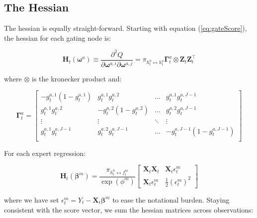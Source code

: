\documentclass[12pt]{article}
\newcommand{\bw}[1]{\boldsymbol{\omega}^{#1}}
\newcommand{\Ht}[1]{\mathbf{H}_{t}(#1)}
\newcommand{\gateprod}[2]{\pi_{#1 \longleftrightarrow #2}}
\begin{document}
\bigskip



\subsection{The Hessian}

The hessian is equally straight-forward. Starting with equation
(\ref{eq:gateScore}), the hessian for each gating node is:


\begin{equation} \label{eq:nodehessian}
  \Ht{\bw{a}} \equiv \frac{\partial^{2} Q}{\partial \boldsymbol{\omega}^{a,i} \partial \boldsymbol{\omega}^{a,j}} = \gateprod{h^{0}_{t}}{h^{a}_{t}} \boldsymbol{\Gamma}^{a}_{t} \otimes  \boldsymbol{Z}_{t} \boldsymbol{Z}_{t}^\top
\end{equation}

where $\otimes$ is the kronecker product and:

\begin{equation}
  \boldsymbol{\Gamma}^{a}_{t} = \begin{bmatrix}
  -g_{t}^{a,1}(1-g_{t}^{a,1}) & g_{t}^{a,1}g_{t}^{a,2}    & \dots  & g_{t}^{a,1}g_{t}^{a,J-1}       \\
  g_{t}^{a,1}g_{t}^{a,2}    & -g_{t}^{a,2}(1-g_{t}^{a,2}) & \dots  & g_{t}^{a,2}g_{t}^{a,J-1}       \\
  \vdots                     &  \vdots                    & \ddots & \vdots                 \\
  g_{t}^{a,1}g_{t}^{a,J-1}  & g_{t}^{a,2}g_{t}^{a,J-1}  & \dots  & -g_{t}^{a,J-1}(1-g_{t}^{a,J-1}) \\
    \end{bmatrix}
\end{equation}

For each expert regression:


\begin{equation}
  \Ht{\boldsymbol{\beta}^{m}} = \frac{\gateprod{h^{0}_{t}}{f^{m}_{t}}}{\exp{(\phi^{m})}} \begin{bmatrix}
  \boldsymbol{X}_{t} \boldsymbol{X}_{t}     &  \boldsymbol{X}_{t} \epsilon^{m}_{t}     \\
  \boldsymbol{X}_{t} \epsilon^{m}_{t}       &  \frac{1}{2} (\epsilon^{m}_{t})^{2}
    \end{bmatrix}
\end{equation}

where we have set $\epsilon^{m}_{t} = Y_{t} - \boldsymbol{X}_{t} \boldsymbol{\beta}^{m}$
to ease the notational burden. Staying consistent with the score vector, we
sum the hessian matrices across observations:
\end{document}

